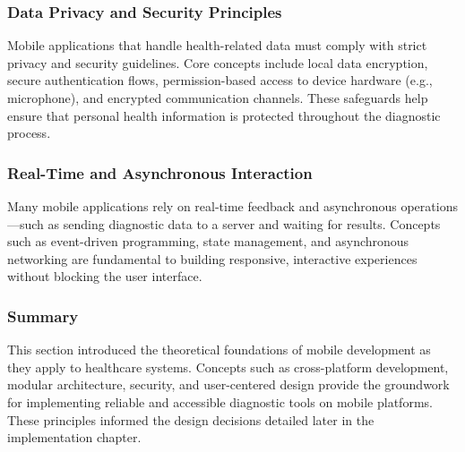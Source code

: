 \subsubsection*{Data Privacy and Security Principles}

Mobile applications that handle health-related data must comply with strict privacy and security guidelines. Core concepts include local data encryption, secure authentication flows, permission-based access to device hardware (e.g., microphone), and encrypted communication channels. These safeguards help ensure that personal health information is protected throughout the diagnostic process.

\subsubsection*{Real-Time and Asynchronous Interaction}

Many mobile applications rely on real-time feedback and asynchronous operations—such as sending diagnostic data to a server and waiting for results. Concepts such as event-driven programming, state management, and asynchronous networking are fundamental to building responsive, interactive experiences without blocking the user interface.

\subsubsection*{Summary}

This section introduced the theoretical foundations of mobile development as they apply to healthcare systems. Concepts such as cross-platform development, modular architecture, security, and user-centered design provide the groundwork for implementing reliable and accessible diagnostic tools on mobile platforms. These principles informed the design decisions detailed later in the implementation chapter.
